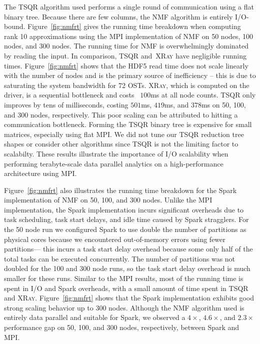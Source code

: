 The TSQR algorithm used performs a single round of communication using a flat binary tree. Because there are few columns, the NMF algorithm is entirely I/O-bound. Figure~\ref{fig:nmfrt} gives the running time breakdown when computing rank 10 approximations using the MPI implementation of NMF on 50 nodes, 100 nodes, and 300 nodes. The running time for NMF is overwhelmingly dominated by reading the input. In comparison, TSQR and~\textsc{XRay} have negligible running times. Figure~\ref{fig:nmfrt} shows that the HDF5 read time does not scale linearly with the number of nodes and is the primary source of inefficiency -- this is due to saturating the system bandwidth for 72 OSTs. \textsc{XRay}, which is computed on the driver, is a sequential bottleneck and costs ~$100$ms at all node counts. TSQR only improves by tens of milliseconds, costing $501$ms, $419$ms, and $378$ms on 50, 100, and 300 nodes, respectively. This poor scaling can be attributed to hitting a communication bottleneck. Forming the TSQR binary tree is expensive for small matrices, especially using flat MPI. We did not tune our TSQR reduction tree shapes or consider other algorithms since TSQR is not the limiting factor to scalabilty. These results illustrate the importance of I/O scalability when performing terabyte-scale data parallel analytics on a high-performance architecture using MPI.

Figure~\ref{fig:nmfrt} also illustrates the running time breakdown for the Spark implementation of NMF on 50, 100, and 300 nodes. Unlike the MPI implementation, the Spark implementation incurs significant overheads due to task scheduling, task start delays, and idle time caused by Spark stragglers. For the 50 node run we configured Spark to use double the number of partitions as physical cores because we encountered out-of-memory errors using fewer partitions--- this incurs a task start delay overhead because some only half of the total tasks can be executed concurrently. The number of partitions was not doubled for the 100 and 300 node runs, so the task start delay overhead is much smaller for these runs. Similar to the MPI results, most of the running time is spent in I/O and Spark overheads, with a small amount of time spent in TSQR and \textsc{XRay}. Figure~\ref{fig:nmfrt} shows that the Spark implementation exhibits good strong scaling behavior up to 300 nodes.  Although the NMF algorithm used is entirely data parallel and suitable for Spark, we observed a $4\times$, $4.6\times$, and $2.3\times$ performance gap on 50, 100, and 300 nodes, respectively, between Spark and MPI.

